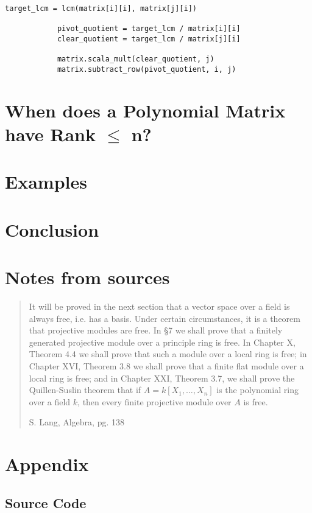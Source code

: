 \documentclass{amsart}
\theoremstyle{definition}
\theoremstyle{remark}
\numberwithin{equation}{section}
\begin{document}
{\begin{lstlisting}[caption=Computing the Row Echelon Form of a Polynomial Matrix]
            target_lcm = lcm(matrix[i][i], matrix[j][i])

            pivot_quotient = target_lcm / matrix[i][i]
            clear_quotient = target_lcm / matrix[j][i]

            matrix.scala_mult(clear_quotient, j)
            matrix.subtract_row(pivot_quotient, i, j)
\end{lstlisting}

\section{When does a Polynomial Matrix have Rank $\leq$ n?}
\label{sec:polynomial-matrix}

\section{Examples}

\section{Conclusion}

\newpage

\section*{Notes from sources}
\label{sec:notes-from-sources}

\blockquote[S. Lang, Algebra, pg. 138]{It will be proved in the next section that a vector space over a field is always free, i.e. has a basis. Under certain circumstances, it is a theorem that projective modules are free. In \S 7 we shall prove that a finitely generated projective module over a principle ring is free. In Chapter X, Theorem 4.4 we shall prove that such a module over a local ring is free; in Chapter XVI, Theorem 3.8 we shall prove that a finite flat module over a local ring is free; and in Chapter XXI, Theorem 3.7, we shall prove the Quillen-Suslin theorem that if $A = k[X_1, \ldots, X_n]$ is the polynomial ring over a field $k$, then every finite projective module over $A$ is free.}

\newpage

\section*{Appendix}

\subsection*{Source Code}

}
\end{document}
